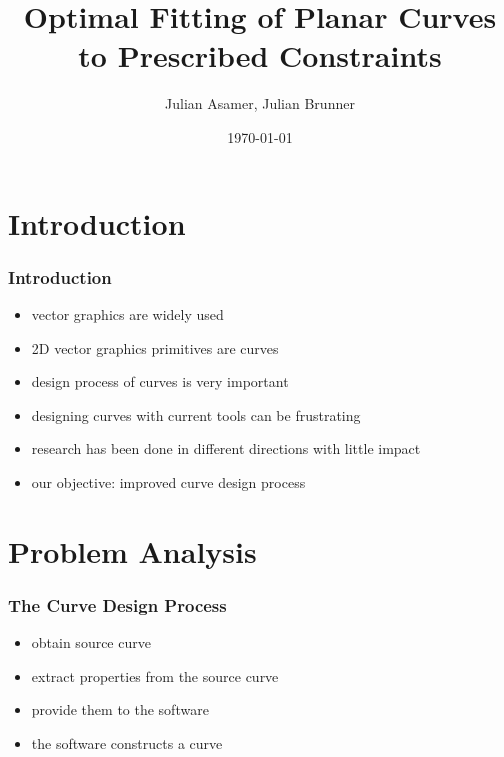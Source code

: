 \documentclass[mathserif]{beamer}
\title{Optimal Fitting of Planar Curves to Prescribed Constraints}
\author{Julian Asamer, Julian Brunner}
\date{\today}
\begin{document}
	\begin{frame}
		\titlepage
	\end{frame}

	\section{Introduction}

		\begin{frame}
			\frametitle{Introduction}
			\begin{itemize}
				\item vector graphics are widely used
				\item 2D vector graphics primitives are curves
				\item design process of curves is very important
				\item designing curves with current tools can be frustrating
				\item research has been done in different directions with little impact
				\item our objective: improved curve design process
			\end{itemize}
		\end{frame}
		
	\section{Problem Analysis}

		\begin{frame}
			\frametitle{The Curve Design Process}
			\begin{itemize}
				\item obtain source curve
				\item extract properties from the source curve 
				\item provide them to the software
				\item the software constructs a curve
			\end{itemize}
		\end{frame}
\end{document}
